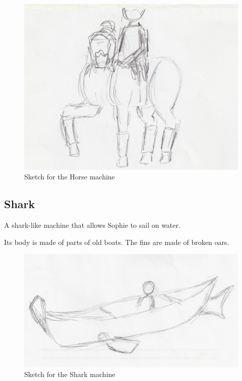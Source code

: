 \begin{figure}[H]
  \centering
  \includegraphics[width=14cm]{Images/Machines/horse}
  \caption{Sketch for the Horse machine}
\end{figure}

\pagebreak

\subsection*{Shark}
A shark-like machine that allows Sophie to sail on water.

Its body is made of parts of old boats. The fins are made of broken oars.

\begin{figure}[H]
  \centering
  \includegraphics[width=14cm]{Images/Machines/shark}
  \caption{Sketch for the Shark machine}
\end{figure}

